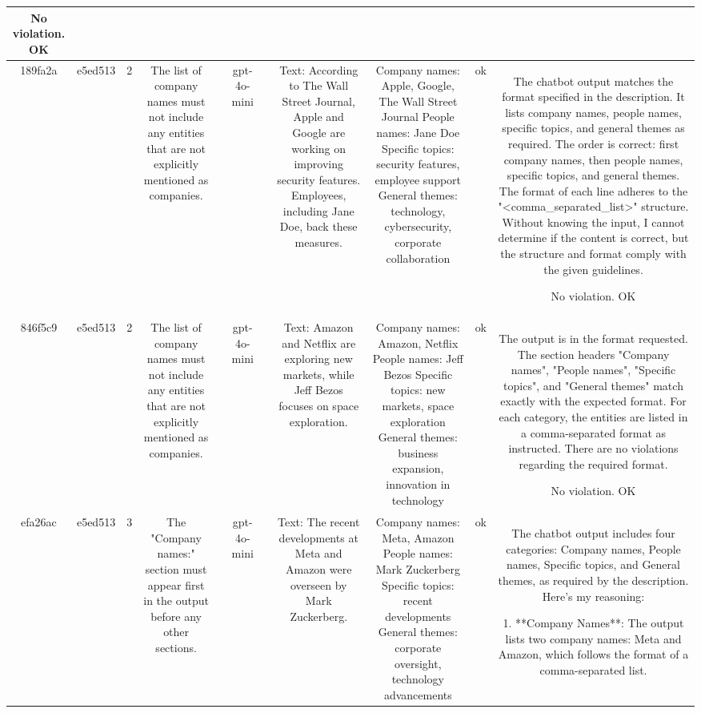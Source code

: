 \begin{table}[h!]
\begin{tabular}{|c|c|c|c|c|c|c|c|c|c|c|}
No violation.
OK\\
\hline
189fa2a & e5ed513 & 2 & The list of company names must not include any entities that are not explicitly mentioned as companies. &  & gpt-4o-mini &  & Text: According to The Wall Street Journal, Apple and Google are working on improving security features. Employees, including Jane Doe, back these measures. & Company names: Apple, Google, The Wall Street Journal
People names: Jane Doe
Specific topics: security features, employee support
General themes: technology, cybersecurity, corporate collaboration & ok & The chatbot output matches the format specified in the description. It lists company names, people names, specific topics, and general themes as required. The order is correct: first company names, then people names, specific topics, and general themes. The format of each line adheres to the "<comma_separated_list>" structure. Without knowing the input, I cannot determine if the content is correct, but the structure and format comply with the given guidelines.

No violation.
OK\\
\hline
846f5c9 & e5ed513 & 2 & The list of company names must not include any entities that are not explicitly mentioned as companies. &  & gpt-4o-mini &  & Text: Amazon and Netflix are exploring new markets, while Jeff Bezos focuses on space exploration. & Company names: Amazon, Netflix  
People names: Jeff Bezos  
Specific topics: new markets, space exploration  
General themes: business expansion, innovation in technology & ok & The output is in the format requested. The section headers "Company names", "People names", "Specific topics", and "General themes" match exactly with the expected format. For each category, the entities are listed in a comma-separated format as instructed. There are no violations regarding the required format.

No violation.
OK\\
\hline
efa26ac & e5ed513 & 3 & The "Company names:" section must appear first in the output before any other sections. &  & gpt-4o-mini &  & Text: The recent developments at Meta and Amazon were overseen by Mark Zuckerberg. & Company names: Meta, Amazon  
People names: Mark Zuckerberg  
Specific topics: recent developments  
General themes: corporate oversight, technology advancements & ok & The chatbot output includes four categories: Company names, People names, Specific topics, and General themes, as required by the description. Here's my reasoning:

1. **Company Names**: The output lists two company names: Meta and Amazon, which follows the format of a comma-separated list.


\end{tabular}
\end{table}
